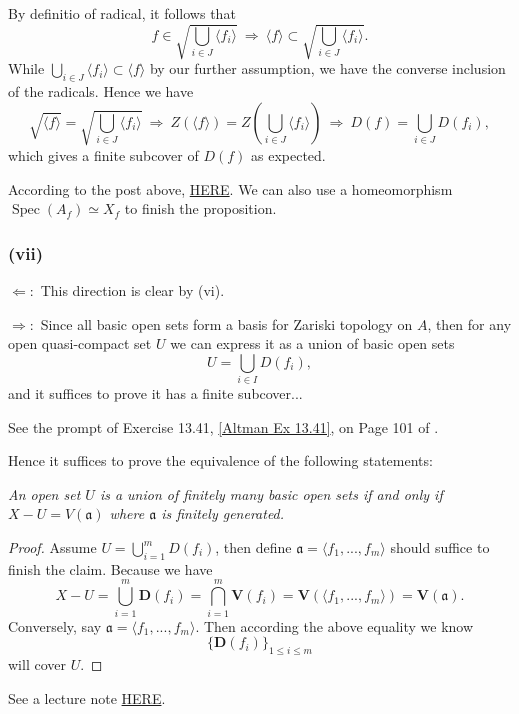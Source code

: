 By definitio of radical, it follows that 
$$f\in \sqrt{\bigcup_{i\in J}\langle f_i\rangle} ~\Rightarrow~ \langle f\rangle \subset \sqrt{\bigcup_{i\in J}\langle f_i\rangle}.$$ While $\bigcup_{i\in J}\langle f_i\rangle\subset \langle f\rangle$ by our further assumption, we have the converse inclusion of the radicals. 
Hence we have 
$$\sqrt{\langle f\rangle}=\sqrt{\bigcup_{i\in J}\langle f_i\rangle} ~\Rightarrow~ Z(\langle f\rangle)=Z(\bigcup_{i\in J}\langle f_i\rangle) ~\Rightarrow~ D(f)=\bigcup_{i\in J}D(f_i),$$ which gives a finite subcover of $D(f)$ as expected.

According to the post above, \href{https://math.stackexchange.com/questions/1175478/basic-open-sets-in-the-zariski-topology-are-also-compact}{HERE}. We can also use a homeomorphism $\operatorname{Spec}(A_f)\simeq X_f$ to finish the proposition. 
\subsubsection{(vii)}
$\Leftarrow:$ This direction is clear by (vi).
 
$\Rightarrow:$ Since all basic open sets form a basis for Zariski topology on $A$, then for any open quasi-compact set $U$ we can express it as a union of basic open sets 
$$U=\bigcup_{i\in I}D(f_{i}),$$ and it suffices to prove it has a finite subcover... 

\smallskip
\medskip

See the prompt of Exercise 13.41, \ref{Altman Ex 13.41}, on Page 101 of \cite{altman}. 
\smallskip

Hence it suffices to prove the equivalence of the following statements:\newline

\textit{An open set $U$ is a union of finitely many basic open sets if and only if $X-U=V(\mathfrak a)$ where $\mathfrak a$ is finitely generated.}
\begin{proof}
Assume $U=\bigcup_{i=1}^m D(f_i)$, then define $\mathfrak a=\langle f_1,...,f_m\rangle$ should suffice to finish the claim. Because we have 
\[X-U=\bigcup_{i=1}^m \mathbf D(f_i)=\bigcap_{i=1}^m \mathbf V(f_i)=\mathbf V(\langle f_1,...,f_m\rangle)=\mathbf V(\mathfrak a).\]
Conversely, say $\mathfrak a=\langle f_1,...,f_m\rangle$. Then according the above equality we know \[\{\mathbf D(f_i)\}_{1\leq i\leq m}\] will cover $U$.
\end{proof}
See a lecture note \href{https://math.stanford.edu/~conrad/Perfseminar/Notes/L3.pdf}{HERE}.



